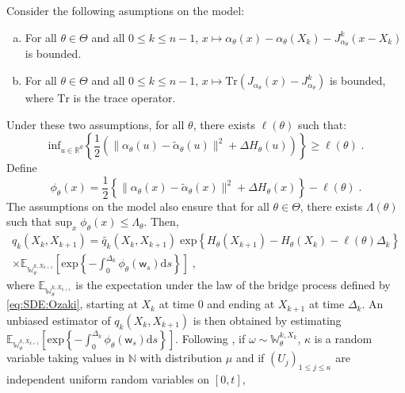 \documentclass[12pt]{article}
\newcommand{\rmd}{\mathrm{d}}
\newcommand{\eqsp}{\;}
\newcommand{\1}{\mathrm{1}}
\newcommand{\qk}{q_{k}}
\newcommand{\Jk}{J_{\alpha_\theta}^k}%
\newcommand{\mw}{\mathsf{w}}%
\begin{document}
Consider the following asumptions on the model:
\begin{enumerate}[(a)]
\item For all $\theta\in\Theta$ and all $0\le k \le n-1$, $x\mapsto \alpha_{\theta}(x) - \alpha_{\theta}(X_k) - \Jk(x-X_k)$ is bounded.
\item For all $\theta\in\Theta$ and all $0\le k \le n-1$, $x\mapsto \mathrm{Tr}\left(J_{\alpha_{\theta}}(x) - \Jk\right)$ is bounded, where $\mathrm{Tr}$ is the trace operator.
\end{enumerate}
Under these two assumptions, for all $\theta$, there exists $\ell(\theta)$ such that:
\[
\mathrm{inf}_{u\in \mathbb{R}^d} \left\{\frac{1}{2}\left(\|\alpha_{\theta}(u)-\widetilde{\alpha}_{\theta}(u)\|^2+\Delta H_{\theta}(u)\right)\right\}\ge \ell(\theta)\eqsp.
\]
Define
\[
\phi_{\theta}(x) = \frac{1}{2}\left\{\|\alpha_{\theta}(x)-\widetilde{\alpha}_{\theta}(x)\|^2+\Delta H_{\theta}(x)\right\}-\ell(\theta)\eqsp.
\]
The assumptions on the model also ensure that for all $\theta\in\Theta$, there exists $\Lambda(\theta)$ such that  $\mathrm{sup}_x\eqsp \phi_{\theta}(x)\le \Lambda_{\theta}$. Then,
\begin{multline*}
\qk(X_{k},X_{k+1}) = \widetilde{\qk}(X_{k},X_{k+1}) \eqsp\mathrm{exp}\left\{H_{\theta}(X_{k+1}) - H_{\theta}(X_{k})-\ell(\theta)\Delta_k\right\}\\
\times\mathbb{E}_{\mathbb{W}_{\theta}^{k,X_{k+1}}}\left[\mathrm{exp}\left\{-\int_{0}^{ \Delta_k}\phi_{\theta}(\mw_s)\rmd s\right\}\right]\eqsp,
\end{multline*}
where $\mathbb{E}_{\mathbb{W}_{\theta}^{k,X_{k+1}}}$ is the expectation under the law of the bridge process defined by \eqref{eq:SDE:Ozaki}, starting at $X_{k}$ at time $0$ and ending at $X_{k+1}$ at time $\Delta_k$.
An unbiased estimator of $\qk(X_{k},X_{k+1})$ is then obtained by estimating $\mathbb{E}_{\mathbb{W}_{\theta}^{k,X_{k+1}}}\left[\mathrm{exp}\left\{-\int_{0}^{ \Delta_k}\phi_{\theta}(\mw_s)\rmd s\right\}\right]$. 
Following \cite{beskos:papaspiliopoulos:roberts:fearnhead:2006}, if $\omega \sim\mathbb{W}_{\theta}^{k,X_{k}}$, $\kappa$ is a random variable taking values in $\mathbb{N}$ with distribution $\mu$ and if $(U_j)_{1\le j\le \kappa}$ are independent uniform random variables on $[0,t]$, 
\end{document}
